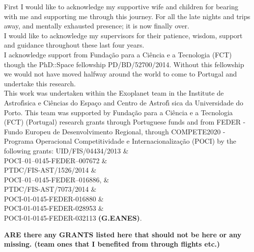 \begin{acknowledgements}
First I would like to acknowledge my supportive wife and children for bearing with me and supporting me through this journey.
For all the late nights and trips away, and mentally exhausted presence; it is now finally over.\\

I would like to acknowledge my supervisors for their patience, wisdom, support and guidance throughout these last four years.\\

I acknowledge support from Funda\c{c}\~{a}o para a Ci\^encia e a Tecnologia (FCT) though the PhD::Space fellowship PD/BD/52700/2014. Without this fellowship we would not have moved halfway around the world to come to Portugal and undertake this research.\\

This work was undertaken within the Exoplanet team in the Institute de Astrof\'{\i}sica e Ci\^encias do Espa\c{c}o and  Centro de Astrof\'{\i} sica da Universidade do Porto. This team was supported by Funda\c{c}\~ao para a Ci\^{e}ncia e a Tecnologia (FCT) (Portugal) research grants through Portuguese funds and from FEDER - Fundo Europeu de Desenvolvimento Regional, through COMPETE2020 - Programa Operacional Competitividade e Internacionaliza\c{c}\~{a}o (POCI) by the following grants:
UID/FIS/04434/2013 \&\\
POCI--01--0145-FEDER--007672 \&\\
PTDC/FIS-AST/1526/2014 \&\\
POCI--01--0145-FEDER--016886, \&\\
PTDC/FIS-AST/7073/2014 \&\\
POCI-01-0145-FEDER-016880 \&\\
POCI-01-0145-FEDER-028953 \&\\
POCI-01-0145-FEDER-032113 \textbf{(G.EANES)}. 


\textbf{ARE there any GRANTS listed here that should not be here or any missing. (team ones that I benefited from through flights etc.) }
\end{acknowledgements}
